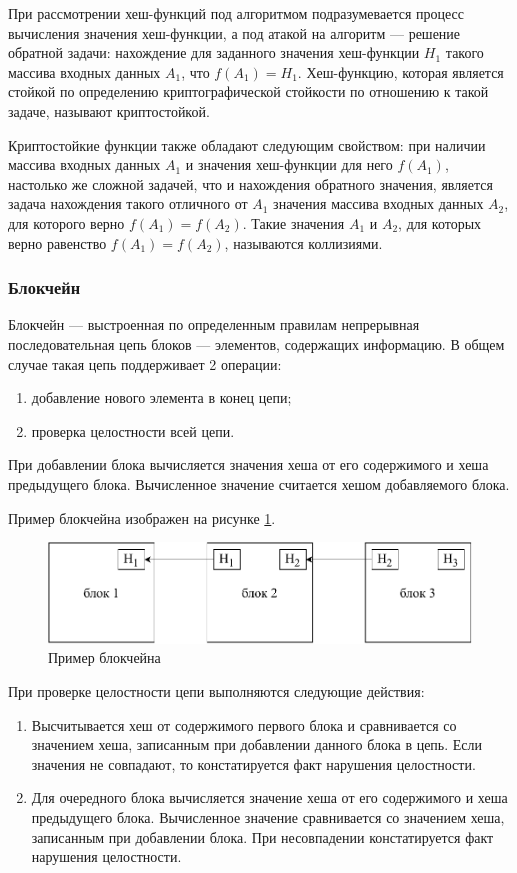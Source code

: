 При рассмотрении хеш-функций под алгоритмом подразумевается процесс вычисления значения хеш-функции, а под атакой на алгоритм --- решение обратной задачи: нахождение для заданного значения хеш-функции $H_1$ такого массива входных данных $A_1$, что $f(A_1) = H_1$. Хеш-функцию, которая является стойкой по определению криптографической стойкости по отношению к такой задаче, называют криптостойкой.

Криптостойкие функции также обладают следующим свойством: при наличии массива входных данных $A_1$ и значения хеш-функции для него $f(A_1)$, настолько же сложной задачей, что и нахождения обратного значения, является задача нахождения такого отличного от $A_1$ значения массива входных данных $A_2$, для которого верно $f(A_1) = f(A_2)$. Такие значения $A_1$ и $A_2$, для которых верно равенство $f(A_1) = f(A_2)$, называются коллизиями.

\subsubsection{Блокчейн}

Блокчейн --- выстроенная по определенным правилам непрерывная последовательная цепь блоков --- элементов, содержащих информацию. \cite{bitcoin} В общем случае такая цепь поддерживает 2 операции:
\begin{enumerate}
	\item добавление нового элемента в конец цепи;
	\item проверка целостности всей цепи.
\end{enumerate}

При добавлении блока вычисляется значения хеша от его содержимого и хеша предыдущего блока. Вычисленное значение считается хешом добавляемого блока.

Пример блокчейна изображен на рисунке \ref{fig:blockchain}.

\begin{figure}[hbtp]
	\centering
	\includegraphics[width=\textwidth]{img/blockchain.pdf}
	\caption{Пример блокчейна}
	\label{fig:blockchain}
\end{figure}

При проверке целостности цепи выполняются следующие действия:
\begin{enumerate}
	\item Высчитывается хеш от содержимого первого блока и сравнивается со значением хеша, записанным при добавлении данного блока в цепь. Если значения не совпадают, то констатируется факт нарушения целостности.
	\item Для очередного блока вычисляется значение хеша от его содержимого и хеша предыдущего блока. Вычисленное значение сравнивается со значением хеша, записанным при добавлении блока. При несовпадении констатируется факт нарушения целостности.
\end{enumerate}

